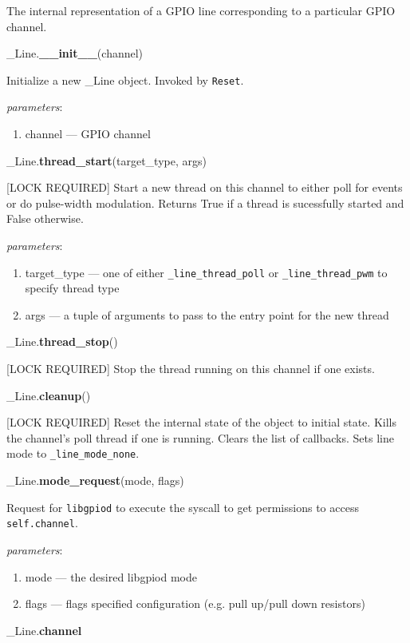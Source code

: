 \documentclass[12pt]{article}
\begin{document}
The internal representation of a GPIO line corresponding to a particular GPIO channel.

\medskip

\noindent \_Line.\textbf{\_\_init\_\_}(channel)
        
Initialize a new \_Line object. Invoked by \texttt{Reset}.

\textit{parameters}:
\begin{enumerate}
        \item channel --- GPIO channel
\end{enumerate}
 
\noindent \_Line.\textbf{thread\_start}(target\_type, args)

[LOCK REQUIRED] Start a new thread on this channel to either poll for events or do pulse-width modulation.
Returns True if a thread is sucessfully started and False otherwise.

\textit{parameters}:
\begin{enumerate}
	\item target\_type --- one of either \texttt{\_line\_thread\_poll} or \texttt{\_line\_thread\_pwm} to specify thread type
	\item args --- a tuple of arguments to pass to the entry point for the new thread
\end{enumerate}

\noindent \_Line.\textbf{thread\_stop}()

[LOCK REQUIRED] Stop the thread running on this channel if one exists.

\noindent \_Line.\textbf{cleanup}()
      
[LOCK REQUIRED] Reset the internal state of the object to initial state. Kills the channel's poll thread if one is running. Clears the list of callbacks. Sets line mode to \texttt{\_line\_mode\_none}.

\noindent \_Line.\textbf{mode\_request}(mode, flags)

Request for \texttt{libgpiod} to execute the syscall to get permissions to access \texttt{self.channel}.

\textit{parameters}:
\begin{enumerate}
        \item mode --- the desired libgpiod mode
        \item flags --- flags specified configuration (e.g. pull up/pull down resistors)
\end{enumerate}

\noindent \_Line.\textbf{channel}
\end{document}
